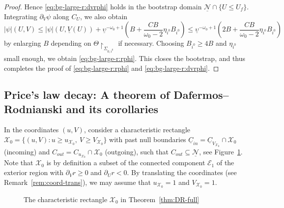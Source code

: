 \documentclass[10pt, reqno]{amsart}
\theoremstyle{definition}
\theoremstyle{remark}
\theoremstyle{conjecture}
\numberwithin{equation}{section}
\newcommand{\abs}[1]{\vert#1\vert}
\newcommand{\set}[1]{\{#1\}}
\newcommand{\rd}{\partial}
\newcommand{\0}{\emptyset}
\newcommand{\Sgm}{\Sigma}
\newcommand{\Tht}{\Theta}
\newcommand{\omg}{\omega}
\newcommand{\ups}{\upsilon}
\newcommand{\calN}{\mathcal N}
\newcommand{\calX}{\mathcal X}
\newcommand{\uC}{\underline{C}}
\newcommand{\Ext}{\mathscr{E}}
\begin{document}
\begin{proof}
Hence \eqref{eq:bg-large-r:dvrphi} holds in the bootstrap domain $\underline{\calN} \cap \set{U \leq U_{f}}$.
Integrating $\rd_{V} \psi$ along $C_{U}$, we also obtain
\begin{equation*}
	\abs{\psi} (U, V) \leq \abs{\psi}(U, \underline{V}(U)) + \underline{\ups}^{-\omg_{0}+1} \left(B + \frac{C B}{\omg_{0}-2} \eta_{i^{0}} B_{i^{0}} \right) \leq \underline{\ups}^{-\omg_{0}+1} \left(2 B + \frac{C B}{\omg_{0}-2} \eta_{i^{0}} B_{i^{0}} \right)
\end{equation*}
by enlarging $B$ depending on $\Tht \restriction_{\Sgm_{0, i^{0}}}$ if necessary. Choosing $B_{i^{0}} \geq 4B$ and $\eta_{i^{0}}$ small enough, we obtain \eqref{eq:bg-large-r:rphi}. This closes the bootstrap, and thus completes the proof of \eqref{eq:bg-large-r:rphi} and \eqref{eq:bg-large-r:dvrphi}.  \qedhere
\end{proof}

\subsection{Price's law decay: A theorem of Dafermos--Rodnianski and its corollaries} \label{subsec:DR-full}
In the coordinates $(u, V)$, consider a characteristic rectangle $\calX_{0} = \set{(u, V) : u \geq u_{\calX_{0}}, \ V \geq V_{\calX_{0}}}$ with past null boundaries $\uC_{in} = \uC_{V_{\calX_{0}}} \cap \calX_{0}$ (incoming) and $C_{out} = C_{u_{\calX_{0}}} \cap \calX_{0}$ (outgoing), such that $C_{out} \subseteq \underline{\calN}$, see Figure~\ref{fig:DR-full}. Note that $\calX_0$ is by definition a subset of the connected component $\Ext_{1}$ of the exterior region with $\rd_V r \geq 0$ and $\rd_U r<0$. By translating the coordinates (see Remark~\ref{rem:coord-trans}), we may assume that $u_{\calX_{0}} = 1$ and $V_{\calX_{0}} = 1$.


\begin{figure}[h]
\begin{center}
 
\caption{The characteristic rectangle $\calX_{0}$ in Theorem~\ref{thm:DR-full}} \label{fig:DR-full}
\end{center}
\end{figure}
\end{document}
